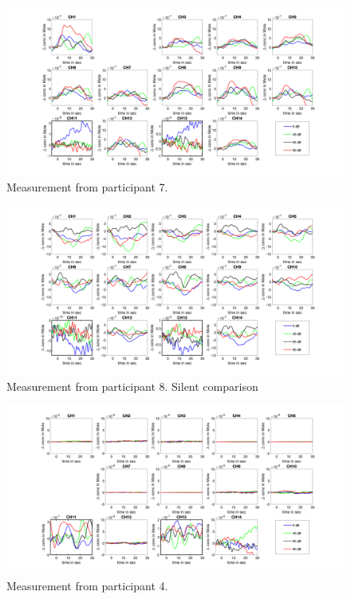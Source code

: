 \begin{figure}[H]
  \centering
    \includegraphics[scale=.4]{bilder/HbO_Mole/sub_liao_s_HbO.png}
  \caption{Measurement from participant 7.}
  \label{fig:somesignal}
\end{figure}


\begin{figure}[H]
  \centering
    \includegraphics[scale=.4]{bilder/HbO_Mole/sub_luca2_s_HbO.png}
  \caption{Measurement from participant 8. Silent comparison}
  \label{fig:somesignal}
\end{figure}

\begin{figure}[H]
  \centering
    \includegraphics[scale=.4]{bilder/HbO_Mole/sub_lin_s_HbO.png}
  \caption{Measurement from participant 4.}
  \label{fig:somesignal}
\end{figure}

